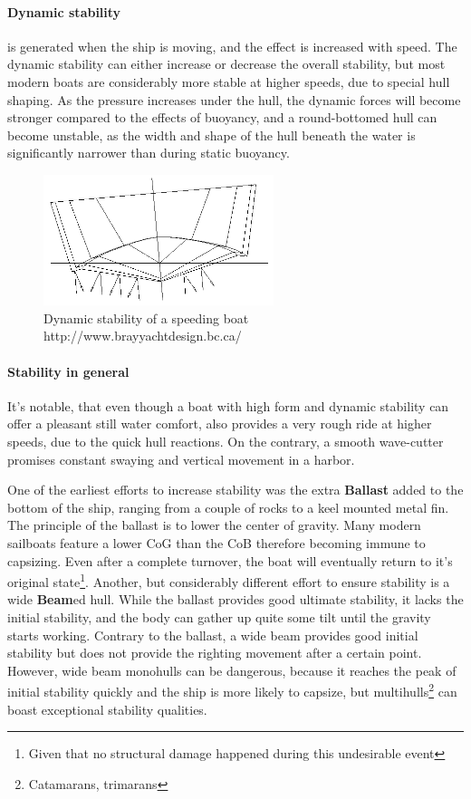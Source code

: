 \paragraph{Dynamic stability} is generated when the ship is moving, and the effect is increased with speed. The dynamic stability can either increase or decrease the overall stability, but most modern boats are considerably more stable at higher speeds, due to special hull shaping. As the pressure increases under the hull, the dynamic forces will become stronger compared to the effects of buoyancy, and a round-bottomed hull can become unstable, as the width and shape of the hull beneath the water is significantly narrower than during static buoyancy.

\begin{figure}[H]
	\centering
	\includegraphics[width=0.6\textwidth]{img3/stability2}
	\caption{Dynamic stability of a speeding boat\\http://www.brayyachtdesign.bc.ca/}
	\label{fig:stability2}
\end{figure}

\paragraph{Stability in general} It's notable, that even though a boat with high form and dynamic stability can offer a pleasant still water comfort, also provides a very rough ride at higher speeds, due to the quick hull reactions. On the contrary, a smooth wave-cutter promises constant swaying and vertical movement in a harbor.

One of the earliest efforts to increase stability was the extra \textbf{Ballast} added to the bottom of the ship, ranging from a couple of rocks to a keel mounted metal fin. The principle of the ballast is to lower the center of gravity. Many modern sailboats feature a lower CoG than the CoB therefore becoming immune to capsizing. Even after a complete turnover, the boat will eventually return to it's original state\footnote{Given that no structural damage happened during this undesirable event}.
Another, but considerably different effort to ensure stability is a wide \textbf{Beam}ed hull. While the ballast provides good ultimate stability, it lacks the initial stability, and the body can gather up quite some tilt until the gravity starts working. Contrary to the ballast, a wide beam provides good initial stability but does not provide the righting movement after a certain point. However,  wide beam monohulls can be dangerous, because it reaches the peak of initial stability quickly and the ship is more likely to capsize, but multihulls\footnote{Catamarans, trimarans} can boast exceptional stability qualities.

